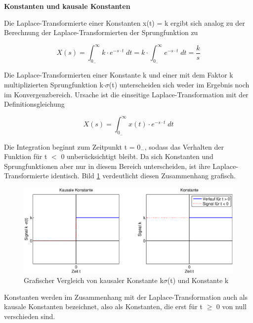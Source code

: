 {\selectfont
\noindent\textbf{Konstanten und kausale Konstanten}}\smallskip

\noindent Die Laplace-Transformierte einer Konstanten x(t) = k ergibt sich analog zu der Berechnung der Laplace-Transformierten der Sprungfunktion zu

\begin{equation}\label{eq:foursixteen}
X\left(s\right)=\int _{0_{-} }^{\infty }k\cdot e^{-s\cdot t} \; dt=k\cdot \int _{0_{-} }^{\infty }e^{-s\cdot t} \; dt=\frac{k}{s}
\end{equation}

\noindent Die Laplace-Transformierten einer Konstante k und einer mit dem Faktor k multiplizierten Sprungfunktion k$\cdot\sigma$(t) unterscheiden sich weder im Ergebnis noch im Konvergenzbereich. Ursache ist die einseitige Laplace-Transformation mit der Definitionsgleichung

\begin{equation}\label{eq:fourseventeen}
X\left(s\right)=\int _{0_{-} }^{\infty }x\left(t\right)\cdot e^{-s\cdot t} \; dt
\end{equation}

\noindent Die Integration beginnt zum Zeitpunkt t = 0$_{-}$, sodass das Verhalten der Funktion für t $\mathrm{<}$ 0 unberücksichtigt bleibt. Da sich Konstanten und Sprungfunktionen aber nur in diesem Bereich unterscheiden, ist ihre Laplace-Transformierte identisch. Bild \ref{fig:LaplaceSignaleKausaleKonstant} verdeutlicht diesen Zusammenhang grafisch.

\begin{figure}[H]
  \centerline{\includegraphics[width=1\textwidth]{Kapitel3/Bilder/image4}}
  \caption{Grafischer Vergleich von kausaler Konstante k$\sigma$(t) und Konstante k}
  \label{fig:LaplaceSignaleKausaleKonstant}
\end{figure}

\noindent Konstanten werden im Zusammenhang mit der Laplace-Transformation auch als kausale Konstanten bezeichnet, also als Konstanten, die erst für t $\geq$ 0 von null verschieden sind.\bigskip

